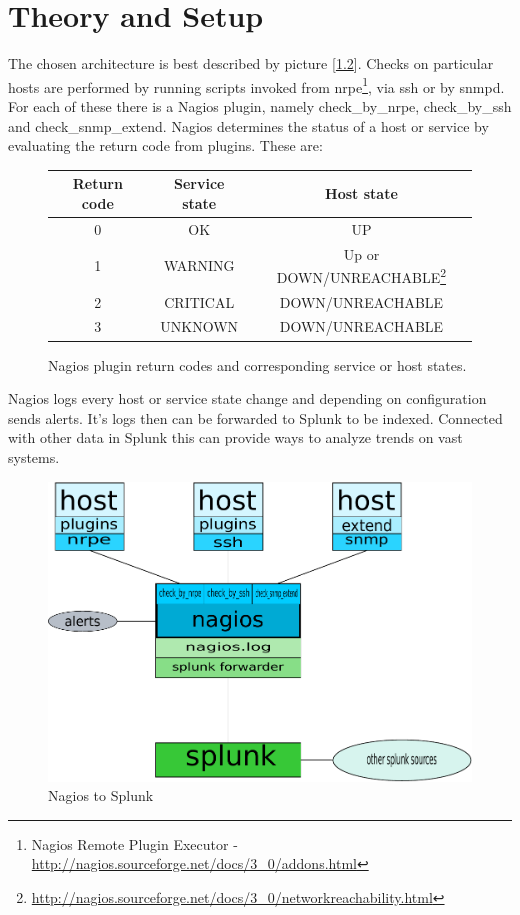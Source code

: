 \documentclass[10pt,a4paper,final]{report}
\begin{document}
\chapter{Theory and Setup}
The chosen architecture is best described by picture [\ref{NtS}]. Checks on particular hosts are performed by running scripts invoked from nrpe\footnote{Nagios Remote Plugin Executor - \url{http://nagios.sourceforge.net/docs/3\_0/addons.html}}, via ssh or by snmpd. For each of these there is a Nagios plugin, namely check\_by\_nrpe, check\_by\_ssh and check\_snmp\_extend. Nagios determines the status of a host or service by evaluating the return code from plugins. These are:
\begin{figure}[hbpt]
\begin{center}
\begin{tabular}{|c|c|c|}
\hline Return code & Service state & Host state \\ 
\hline 0 & OK & UP \\ 
\hline 1 & WARNING & Up or DOWN/UNREACHABLE\footnote{\url{http://nagios.sourceforge.net/docs/3\_0/networkreachability.html}} \\ 
\hline 2 & CRITICAL & DOWN/UNREACHABLE \\ 
\hline 3 & UNKNOWN & DOWN/UNREACHABLE \\ 
\hline 
\end{tabular}
\end{center}
\caption{Nagios plugin return codes and corresponding service or host states.}
\label{ReturnC}
\end{figure}

Nagios logs every host or service state change and depending on configuration sends alerts. It's logs then can be forwarded to Splunk to be indexed. Connected with other data in Splunk this can provide ways to analyze trends on vast systems. 

\begin{figure}[hbpt]
\begin{center}
\includegraphics[scale=0.5]{nts.pdf}
\end{center}
\caption{Nagios to Splunk}
\label{NtS}
\end{figure}
\end{document}
